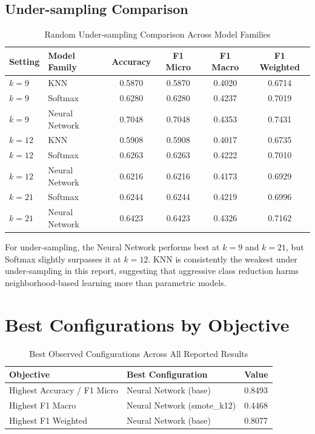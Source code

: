 \documentclass[12pt,a4paper]{report}
\begin{document}
\subsection{Under-sampling Comparison}
\begin{table}[H]
    \centering
    \caption{Random Under-sampling Comparison Across Model Families}
    \label{tab:undersample-comparison-all-models}
    \begin{tabular}{llcccc}
        \toprule
        \textbf{Setting} & \textbf{Model Family} & \textbf{Accuracy} & \textbf{F1 Micro} & \textbf{F1 Macro} & \textbf{F1 Weighted} \\
        \midrule
        $k=9$ & KNN & 0.5870 & 0.5870 & 0.4020 & 0.6714 \\
        $k=9$ & Softmax & 0.6280 & 0.6280 & 0.4237 & 0.7019 \\
        $k=9$ & Neural Network & 0.7048 & 0.7048 & 0.4353 & 0.7431 \\
        \midrule
        $k=12$ & KNN & 0.5908 & 0.5908 & 0.4017 & 0.6735 \\
        $k=12$ & Softmax & 0.6263 & 0.6263 & 0.4222 & 0.7010 \\
        $k=12$ & Neural Network & 0.6216 & 0.6216 & 0.4173 & 0.6929 \\
        \midrule
        $k=21$ & Softmax & 0.6244 & 0.6244 & 0.4219 & 0.6996 \\
        $k=21$ & Neural Network & 0.6423 & 0.6423 & 0.4326 & 0.7162 \\
        \bottomrule
    \end{tabular}
\end{table}

For under-sampling, the Neural Network performs best at $k=9$ and $k=21$, but Softmax slightly surpasses it at $k=12$. KNN is consistently the weakest under under-sampling in this report, suggesting that aggressive class reduction harms neighborhood-based learning more than parametric models.

\section{Best Configurations by Objective}
\begin{table}[H]
    \centering
    \caption{Best Observed Configurations Across All Reported Results}
    \label{tab:best-overall-by-objective}
    \begin{tabular}{lll}
        \toprule
        \textbf{Objective} & \textbf{Best Configuration} & \textbf{Value} \\
        \midrule
        Highest Accuracy / F1 Micro & Neural Network (base) & 0.8493 \\
        Highest F1 Macro & Neural Network (smote\_k12) & 0.4468 \\
        Highest F1 Weighted & Neural Network (base) & 0.8077 \\
        \bottomrule
    \end{tabular}
\end{table}
\end{document}
